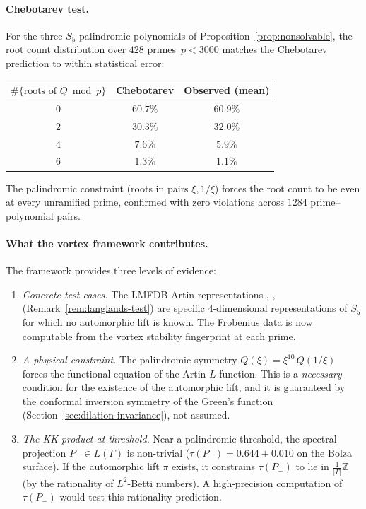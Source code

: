 \paragraph{Chebotarev test.}
For the three $S_5$ palindromic polynomials of
Proposition~\ref{prop:nonsolvable}, the root count
distribution over $428$ primes~$p < 3000$ matches the
Chebotarev prediction to within statistical error:
\begin{center}
\begin{tabular}{ccc}
\toprule
$\#\{\text{roots of } Q \bmod p\}$ &
  Chebotarev & Observed (mean) \\
\midrule
$0$ & $60.7\%$ & $60.9\%$ \\
$2$ & $30.3\%$ & $32.0\%$ \\
$4$ & $7.6\%$  & $5.9\%$ \\
$6$ & $1.3\%$  & $1.1\%$ \\
\bottomrule
\end{tabular}
\end{center}
The palindromic constraint (roots in pairs $\xi, 1/\xi$)
forces the root count to be even at every unramified prime,
confirmed with zero violations across $1284$ prime--polynomial
pairs.

\paragraph{What the vortex framework contributes.}
The framework provides three levels of evidence:
\begin{enumerate}
  \item \emph{Concrete test cases.}
    The LMFDB Artin representations
    , ,
    (Remark~\ref{rem:langlands-test}) are specific
    4-dimensional representations of $S_5$ for which no
    automorphic lift is known.
    The Frobenius data is now computable from the vortex
    stability fingerprint at each prime.
  \item \emph{A physical constraint.}
    The palindromic symmetry $Q(\xi) = \xi^{10}\,Q(1/\xi)$
    forces the functional equation of the Artin $L$-function.
    This is a \emph{necessary} condition for the existence of
    the automorphic lift, and it is guaranteed by the conformal
    inversion symmetry of the Green's function
    (Section~\ref{sec:dilation-invariance}), not assumed.
  \item \emph{The KK product at threshold.}
    Near a palindromic threshold, the spectral projection
    $P_- \in L(\Gamma)$ is non-trivial
    ($\tau(P_-) = 0.644 \pm 0.010$ on the Bolza surface).
    If the automorphic lift $\pi$ exists, it constrains
    $\tau(P_-)$ to lie in $\frac{1}{|\Gamma|}\mathbb{Z}$
    (by the rationality of $L^2$-Betti numbers).
    A high-precision computation of $\tau(P_-)$ would test
    this rationality prediction.
\end{enumerate}

